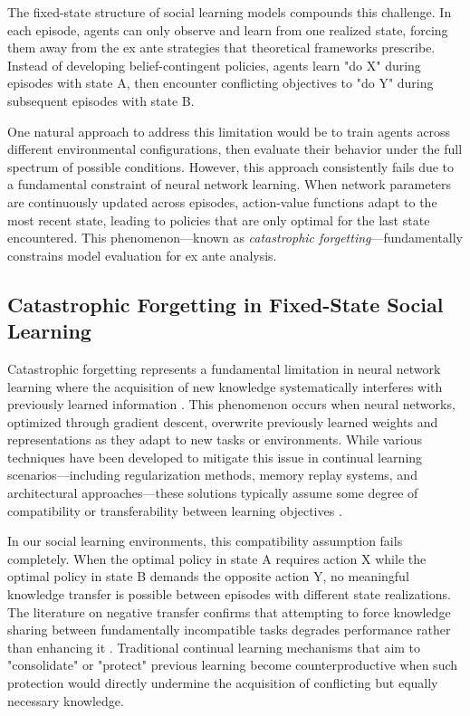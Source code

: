 The fixed-state structure of social learning models compounds this challenge. In each episode, agents can only observe and learn from one realized state, forcing them away from the ex ante strategies that theoretical frameworks prescribe. Instead of developing belief-contingent policies, agents learn "do X" during episodes with state A, then encounter conflicting objectives to "do Y" during subsequent episodes with state B. 

One natural approach to address this limitation would be to train agents across different environmental configurations, then evaluate their behavior under the full spectrum of possible conditions. However, this approach consistently fails due to a fundamental constraint of neural network learning. When network parameters are continuously updated across episodes, action-value functions adapt to the most recent state, leading to policies that are only optimal for the last state encountered. This phenomenon—known as \emph{catastrophic forgetting}—fundamentally constrains model evaluation for ex ante analysis.

\subsection{Catastrophic Forgetting in Fixed-State Social Learning}

Catastrophic forgetting represents a fundamental limitation in neural network learning where the acquisition of new knowledge systematically interferes with previously learned information \citep{vandeven2024continuallearningcatastrophicforgetting}. This phenomenon occurs when neural networks, optimized through gradient descent, overwrite previously learned weights and representations as they adapt to new tasks or environments. While various techniques have been developed to mitigate this issue in continual learning scenarios—including regularization methods, memory replay systems, and architectural approaches—these solutions typically assume some degree of compatibility or transferability between learning objectives \citep{kirkpatrick2017overcoming, zenke2017continuallearningsynapticintelligence, rebuffi2017icarl, rusu2016progressive}.


In our social learning environments, this compatibility assumption fails completely. When the optimal policy in state A requires action X while the optimal policy in state B demands the opposite action Y, no meaningful knowledge transfer is possible between episodes with different state realizations. The literature on negative transfer confirms that attempting to force knowledge sharing between fundamentally incompatible tasks degrades performance rather than enhancing it \citep{ahn2024catastrophic, wu2021online}. Traditional continual learning mechanisms that aim to "consolidate" or "protect" previous learning become counterproductive when such protection would directly undermine the acquisition of conflicting but equally necessary knowledge.

